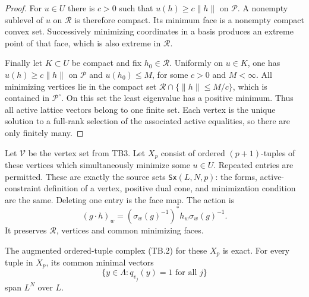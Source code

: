 \begin{proof}
For $u\in U$ there is $c>0$ such that $u(h)\ge c\|h\|$ on
$\mathcal P$.  A nonempty sublevel of $u$ on $\mathcal R$ is
therefore compact.  Its minimum face is a nonempty compact convex
set.  Successively minimizing coordinates in a basis produces an
extreme point of that face, which is also extreme in $\mathcal R$.

Finally let $K\subset U$ be compact and fix $h_0\in\mathcal R$.
Uniformly on $u\in K$, one has $u(h)\ge c\|h\|$ on $\mathcal P$
and $u(h_0)\le M$, for some $c>0$ and $M<\infty$.  All minimizing
vertices lie in the compact set
$\mathcal R\cap\{\|h\|\le M/c\}$, which is contained in
$\mathcal P^\circ$.  On this set the least eigenvalue has a positive
minimum.  Thus all active lattice vectors belong to one finite set.
Each vertex is the unique solution to a full-rank selection of the
associated active equalities, so there are only finitely many.
\end{proof}

Let $\mathcal V$ be the vertex set from TB3.  Let $X_p$ consist of
ordered $(p+1)$-tuples of these vertices which simultaneously
minimize some $u\in U$.  Repeated entries are permitted.  These
are exactly the source sets \texttt{Sx}$(L,N,p)$: the forms,
active-constraint definition of a vertex, positive dual cone,
and minimization condition are the same.  Deleting one entry is
the face map.  The action is
\[
       (g\cdot h)_w=(\sigma_w(g)^{-1})^*h_w\sigma_w(g)^{-1}.
       \tag{TB.7}
\]
It preserves $\mathcal R$, vertices and common minimizing faces.

\begin{proposition}
\label{prop:tb-nerve}
The augmented ordered-tuple complex (TB.2) for these $X_p$ is exact.
For every tuple in $X_p$, its common minimal vectors
\[
 \{y\in\Lambda:q_{v_j}(y)=1\text{ for all }j\}
 \tag{TB.8}
\]
span $L^N$ over $L$.
\end{proposition}

